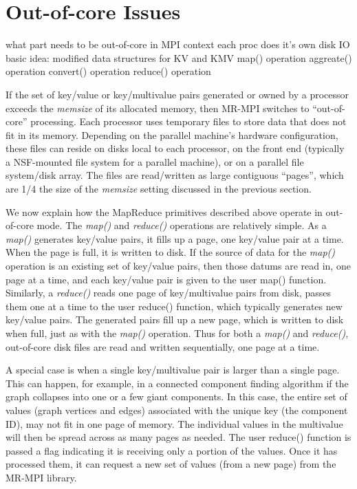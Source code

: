 \section{Out-of-core Issues}
\label{sec:outcore}

  what part needs to be out-of-core in MPI context
  each proc does it's own disk IO
  basic idea: modified data structures for KV and KMV
  map() operation
  aggreate() operation
  convert() operation
  reduce() operation

If the set of key/value or key/multivalue pairs generated or owned by
a processor exceeds the {\it memsize} of its allocated memory, then
MR-MPI switches to ``out-of-core'' processing.  Each processor uses
temporary files to store data that does not fit in its memory.
Depending on the parallel machine's hardware configuration, these
files can reside on disks local to each processor, on the front end
(typically a NSF-mounted file system for a parallel machine), or on a
parallel file system/disk array.  The files are read/written as large
contiguous ``pages'', which are 1/4 the size of the {\it memsize}
setting discussed in the previous section.

We now explain how the MapReduce primitives described above operate in
out-of-core mode.  The {\it map()} and {\it reduce()} operations are
relatively simple.  As a {\it map()} generates key/value pairs, it
fills up a page, one key/value pair at a time.  When the page is full,
it is written to disk.  If the source of data for the {\it map()}
operation is an existing set of key/value pairs, then those datums are
read in, one page at a time, and each key/value pair is given to the
user map() function.  Similarly, a {\it reduce()} reads one page of
key/multivalue pairs from disk, passes them one at a time to the user
reduce() function, which typically generates new key/value pairs.  The
generated pairs fill up a new page, which is written to disk when
full, just as with the {\it map()} operation.  Thus for both a {\it
map()} and {\it reduce()}, out-of-core disk files are read and written
sequentially, one page at a time.

A special case is when a single key/multivalue pair is larger than a
single page.  This can happen, for example, in a connected component
finding algorithm if the graph collapses into one or a few giant
components.  In this case, the entire set of values (graph vertices
and edges) associated with the unique key (the component ID), may not
fit in one page of memory.  The individual values in the multivalue
will then be spread across as many pages as needed.  The user reduce()
function is passed a flag indicating it is receiving only a portion of
the values.  Once it has processed them, it can request a new set of
values (from a new page) from the MR-MPI library.

